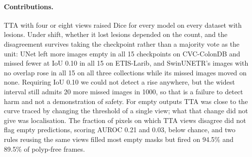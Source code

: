 \paragraph{Contributions.}
TTA with four or eight views raised Dice for every model on every dataset with lesions. Under shift, whether it lost lesions depended on the count, and the disagreement survives taking the checkpoint rather than a majority vote as the unit: UNet left more images empty in all 15 checkpoints on CVC-ColonDB and missed fewer at IoU 0.10 in all 15 on ETIS-Larib, and SwinUNETR's images with no overlap rose in all 15 on all three collections while its missed images moved on none. Requiring IoU 0.10 we could not detect a rise anywhere, but the widest interval still admits 20 more missed images in 1000, so that is a failure to detect harm and not a demonstration of safety. For empty outputs TTA was close to the curve traced by changing the threshold of a single view; what that change did not give was localisation. The fraction of pixels on which TTA views disagree did not flag empty predictions, scoring AUROC 0.21 and 0.03, below chance, and two rules reusing the same views filled most empty masks but fired on 94.5\% and 89.5\% of polyp-free frames.
